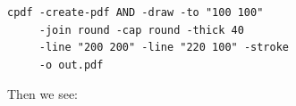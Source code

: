 \documentclass{book}
\begin{document}
\begin{framed}
 \noindent\small\verb?cpdf -create-pdf AND -draw -to "100 100"?\\
 \noindent\small\verb?     -join round -cap round -thick 40?\\
 \noindent\small\verb?     -line "200 200" -line "220 100" -stroke?\\
 \noindent\small\verb?     -o out.pdf?
\end{framed}

\noindent Then we see:

\bigskip
\ifdefined\HCode
{}
\else
{}
\fi
\bigskip
\end{document}
